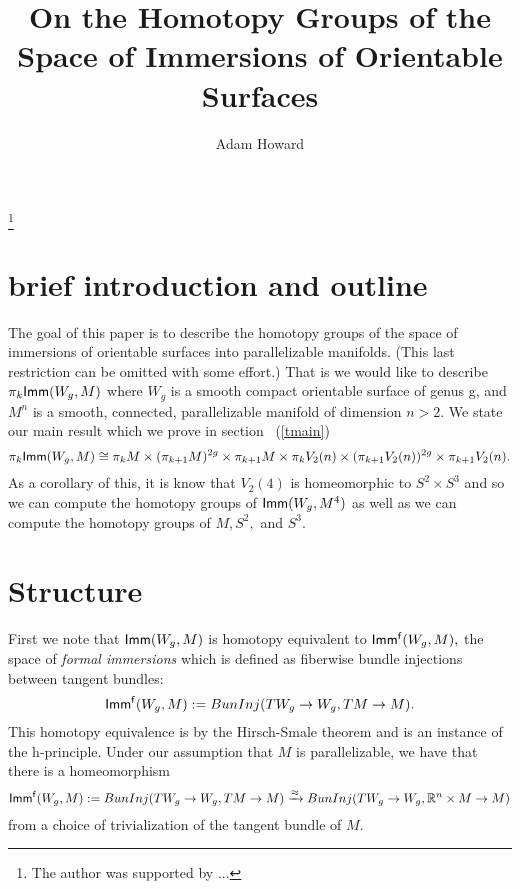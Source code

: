 \documentclass{amsart}
\theoremstyle{definition}
\theoremstyle{remark}
\newcommand{\xra}{\xrightarrow}
\begin{document}
\title{On the Homotopy Groups of the Space of Immersions of Orientable Surfaces}


\author{Adam Howard}




\address{Department of Mathematics\\Montana State University\\Bozeman, MT 59717}
\thanks{The author was supported by ...}






\maketitle


\section{brief introduction and outline}
The goal of this paper is to describe the homotopy groups of the space of immersions of orientable surfaces into parallelizable manifolds. (This last restriction can be omitted with some effort.) That is we would like to describe $\pi_{k}{\sf Imm}(W_{g}, M)$ where $W_{g}$ is a smooth compact orientable surface of genus g, and $M^{n}$ is a smooth, connected, parallelizable manifold of dimension $n > 2.$
We state our main result which we prove in section ~(\ref{tmain})
$$\pi_{k}{\sf Imm}(W_{g}, M) \cong 
 \pi_{k}M \times (\pi_{k + 1}M)^{2g} \times \pi_{k + 1}M \times 
 \pi_{k}V_{2}(n) \times (\pi_{k + 1}V_{2}(n))^{2g} \times \pi_{k + 1}V_{2}(n). $$
As a corollary of this, it is know that $V_{2}(4)$ is homeomorphic to $S^{2} \times S^{3}$ and so we can compute the homotopy groups of ${\sf Imm}(W_{g}, M^{4})$ as well as we can compute the homotopy groups of $M, S^{2},$ and $S^{3}.$


\section{Structure} %
First we note that ${\sf Imm}(W_{g}, M)$ is homotopy equivalent to ${\sf Imm^{f}}(W_{g}, M),$ the space of \textit{formal immersions} which is defined as fiberwise bundle injections between tangent bundles: $${\sf Imm^{f}}(W_{g}, M) := BunInj(TW_{g} \rightarrow W_{g}, TM \rightarrow M).$$
This homotopy equivalence is by the Hirsch-Smale theorem \cite{?} and is an instance of the h-principle.
Under our assumption that $M$ is parallelizable, we have that there is a homeomorphism $${\sf Imm^{f}}(W_{g}, M) := BunInj(TW_{g} \rightarrow W_{g}, TM \rightarrow M) \xra{\approx} BunInj(TW_{g} \rightarrow W_{g}, \RR^{n} \times M \rightarrow M)$$ from a choice of trivialization of the tangent bundle of $M.$
\end{document}
